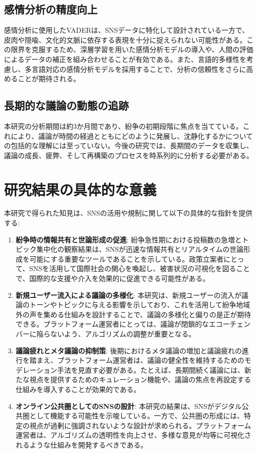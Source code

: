 \documentclass[11pt, a4j]{jreport}
\begin{document}
    \subsection{感情分析の精度向上}
    感情分析に使用したVADERは、SNSデータに特化して設計されている一方で、皮肉や隠喩、文化的文脈に依存する表現を十分に捉えられない可能性がある。この限界を克服するため、深層学習を用いた感情分析モデルの導入や、人間の評価によるデータの補正を組み合わせることが有効である。また、言語的多様性を考慮し、多言語対応の感情分析モデルを採用することで、分析の信頼性をさらに高めることが期待される。

    \subsection{長期的な議論の動態の追跡}
    本研究の分析期間は約3か月間であり、紛争の初期段階に焦点を当てている。これにより、議論が時間の経過とともにどのように発展し、沈静化するかについての包括的な理解には至っていない。今後の研究では、長期間のデータを収集し、議論の成長、疲弊、そして再構築のプロセスを時系列的に分析する必要がある。

    \section{研究結果の具体的な意義}
    本研究で得られた知見は、SNSの活用や規制に関して以下の具体的な指針を提供する:

    \begin{enumerate}
        \item \textbf{紛争時の情報共有と世論形成の促進}:
        紛争急性期における投稿数の急増とトピック集中化の観察結果は、SNSが迅速な情報共有とリアルタイムの世論形成を可能にする重要なツールであることを示している。政策立案者にとって、SNSを活用して国際社会の関心を喚起し、被害状況の可視化を図ることで、国際的な支援や介入を効果的に促進できる可能性がある。

        \item \textbf{新規ユーザー流入による議論の多様化}:
        本研究は、新規ユーザーの流入が議論のトーンやトピックに与える影響を示しており、これを活用して紛争地域外の声を集める仕組みを設計することで、議論の多様化と偏りの是正が期待できる。プラットフォーム運営者にとっては、議論が閉鎖的なエコーチェンバーに陥らないよう、アルゴリズムの調整が重要となる。

        \item \textbf{議論疲れとメタ議論の抑制策}:
        後期におけるメタ議論の増加と議論疲れの進行を踏まえ、プラットフォーム運営者は、議論の健全性を維持するためのモデレーション手法を見直す必要がある。たとえば、長期間続く議論には、新たな視点を提供するためのキュレーション機能や、議論の焦点を再設定する仕組みを導入することが効果的である。
    
        \item \textbf{オンライン公共圏としてのSNSの設計}:
        本研究の結果は、SNSがデジタル公共圏として機能する可能性を示唆している。一方で、公共圏の形成には、特定の視点が過剰に強調されないような設計が求められる。プラットフォーム運営者は、アルゴリズムの透明性を向上させ、多様な意見が均等に可視化されるような仕組みを開発するべきである。
    \end{enumerate}
\end{document}
